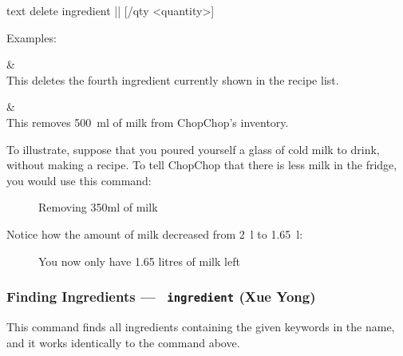 	 \begin{blockofcode}{text}
		delete ingredient |\itemref{}|
			[/qty <quantity>]
	\end{blockofcode}

	Examples:
	\begin{bulletlist}
		&  \\
		  This deletes the fourth ingredient currently shown in the recipe list.

		&  \\
		  This removes \SI{500}{\milli\litre} of milk from ChopChop's inventory.
	\end{bulletlist}

	\pagebreak
	To illustrate, suppose that you poured yourself a glass of cold milk to drink, without making a recipe. To tell ChopChop that there is less milk in the fridge, you would use this command:
	\vspace{-.5em} %
	\begin{figure}[!htbp]\centering\ContinuedFloat*
		\caption{Removing 350ml of milk}
	\end{figure}
	\vspace{-2em} %

	Notice how the amount of milk decreased from \SI{2}{\litre} to \SI{1.65}{\litre}:
	\vspace{-.5em}
	\begin{figure}[!htbp]\centering\ContinuedFloat
		\caption{You now only have 1.65 litres of milk left}
	\end{figure}
	\vspace{-1.5em}












\hypertarget{FindIngredientCommand}{}
\subsubsection{Finding Ingredients — \texttt{ ingredient} (Xue Yong)}

	This command finds all ingredients containing the given keywords in the name, and it works identically to the
	\hyperlink{FindRecipeCommand}{} command above.

